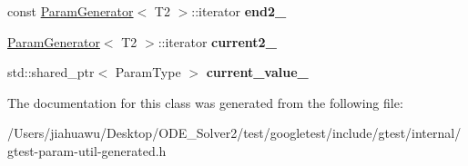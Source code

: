 \begin{DoxyCompactItemize}
const \mbox{\hyperlink{classtesting_1_1internal_1_1_param_generator}{Param\+Generator}}$<$ T2 $>$\+::iterator {\bfseries end2\+\_\+}
\item 
\mbox{\label{classtesting_1_1internal_1_1_cartesian_product_generator2_1_1_iterator_a3832af338d3433abdd84805ded9017e0}} 
\mbox{\hyperlink{classtesting_1_1internal_1_1_param_generator}{Param\+Generator}}$<$ T2 $>$\+::iterator {\bfseries current2\+\_\+}
\item 
\mbox{\label{classtesting_1_1internal_1_1_cartesian_product_generator2_1_1_iterator_a52fe871f3f904759d3f1432e2c7bd339}} 
std\+::shared\+\_\+ptr$<$ Param\+Type $>$ {\bfseries current\+\_\+value\+\_\+}
\end{DoxyCompactItemize}


The documentation for this class was generated from the following file\+:\begin{DoxyCompactItemize}
\item 
/\+Users/jiahuawu/\+Desktop/\+O\+D\+E\+\_\+\+Solver2/test/googletest/include/gtest/internal/gtest-\/param-\/util-\/generated.\+h\end{DoxyCompactItemize}
